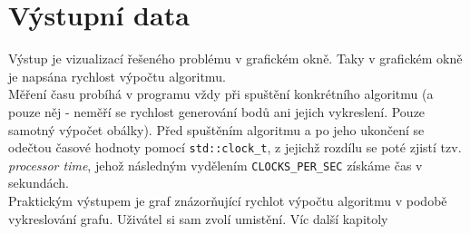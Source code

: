 \documentclass{article}
\begin{document}
\section{Výstupní data}
Výstup je vizualizací řešeného problému v grafickém okně. Taky v grafickém okně je napsána rychlost výpočtu algoritmu.\\ 
Měření času probíhá v programu vždy při spuštění konkrétního algoritmu (a pouze něj - neměří se rychlost generování bodů ani jejich vykreslení. Pouze samotný výpočet obálky). Před spuštěním algoritmu a po jeho ukončení se odečtou časové hodnoty pomocí \texttt{std::clock\_t}, z jejichž rozdílu se poté zjistí tzv. \textit{processor time}, jehož následným vydělením \texttt{CLOCKS\_PER\_SEC} získáme čas v sekundách. \\
Praktickým výstupem je graf znázorňující rychlot výpočtu algoritmu v podobě vykreslování grafu. Uživátel si sam zvolí umistění. Víc další kapitoly\\ 
\bigskip 
\clearpage
\end{document}
